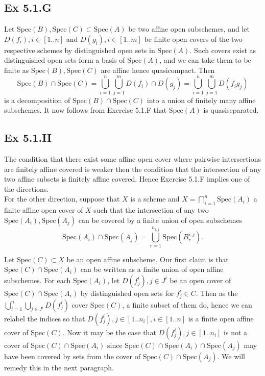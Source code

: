 \documentclass{article}
\theoremstyle{definition}
\newcommand{\Spec}{\text{Spec}}
\begin{document}
\subsection*{Ex 5.1.G}

Let $\Spec(B), \Spec(C) \subset \Spec(A)$ be two affine open subschemes, and
let $D(f_i), i \in [1..n]$ and $D(g_i), i \in [1..m]$ be finite open covers of
the two respective schemes by distinguished open sets in $\Spec(A)$. Such
covers exist as distinguished open sets form a basis of $\Spec(A)$, and we can
take them to be finite as $\Spec(B), \Spec(C)$ are affine hence quasicompact.
Then
\[
	\Spec(B) \cap \Spec(C)
	=
	\bigcup_{i = 1}^{n}
	\bigcup_{j = 1}^{m}
	D(f_i) \cap D(g_j)
	=
	\bigcup_{i = 1}^{n}
	\bigcup_{j = 1}^{m}
	D(f_ig_j)
\]
is a decomposition of $\Spec(B) \cap \Spec(C)$ into a union of finitely many
affine subschemes. It now follows from Exercise 5.1.F that $\Spec(A)$ is
quasiseparated.

\subsection*{Ex 5.1.H}

The condition that there exist some affine open cover where pairwise
intersections are finitely affine covered is weaker then the condition that the
intersection of any two affine subsets is finitely affine covered. Hence
Exercise 5.1.F implies one of the directions. \\

For the other direction, suppose that $X$ is a scheme and $X = \bigcap_{i =
		1}^{n} \Spec(A_i)$ a finite affine open cover of $X$ such that the intersection
of any two $\Spec(A_i), \Spec(A_j)$ can be covered by a finite union of open
subschemes
\[
	\Spec(A_i) \cap \Spec(A_j)
	=
	\bigcup_{r = 1}^{n_{i,j}} \Spec(B_{r}^{i, j}).
\]

Let $\Spec(C) \subset X$ be an open affine subscheme. Our first claim is that
$\Spec(C) \cap \Spec(A_i)$ can be written as a finite union of open affine
subschemes. For each $\Spec(A_i)$, let $D(f_j^i), j \in J^{i}$ be an open cover
of $\Spec(C) \cap \Spec(A_i)$ by distinguished open sets for $f_{j}^{i} \in C$.
Then as the $\bigcup_{i = 1}^{n}\bigcup_{j \in J^i} D(f_j^i)$ cover $\Spec(C)$,
a finite subset of them do, hence we can relabel the indices so that $D(f_j^i),
	j \in [1.. n_i], i \in [1..n]$ is a finite open affine cover of $\Spec(C)$. Now
it may be the case that $D(f_j^i), j \in [1.. n_i]$ is not a cover of $\Spec(C)
	\cap \Spec(A_i)$ since $\Spec(C) \cap \Spec(A_i) \cap \Spec(A_j)$ may have been
covered by sets from the cover of $\Spec(C) \cap \Spec(A_j)$. We will remedy
this in the next paragraph. \\
\end{document}
